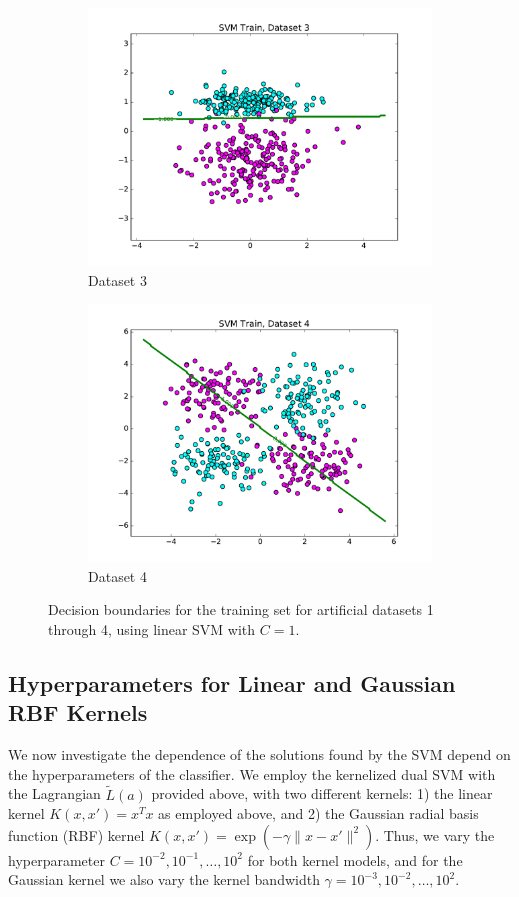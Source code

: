 \documentclass[10pt,psamsfonts]{amsart}
\theoremstyle{definition}
\theoremstyle{remark}
\numberwithin{equation}{section}
\begin{document}
\begin{figure}
\begin{subfigure}[b]{0.23\textwidth}
		\includegraphics[width=\textwidth]{hw2_2-2_3_train.pdf}
		\caption{Dataset 3}
	\end{subfigure}
	\begin{subfigure}[b]{0.23\textwidth}
		\includegraphics[width=\textwidth]{hw2_2-2_4_train.pdf}
		\caption{Dataset 4}
	\end{subfigure}
	\caption{Decision boundaries for the training set for artificial datasets 1 through 4, using linear SVM with $C = 1$.}
\end{figure}

\subsection{Hyperparameters for Linear and Gaussian RBF Kernels} We now investigate the dependence of the solutions found by the SVM depend on the hyperparameters of the classifier. We employ the kernelized dual SVM with the Lagrangian $\tilde{L}(a)$ provided above, with two different kernels: 1) the linear kernel $K(x,x') = x^Tx$ as employed above, and 2) the Gaussian radial basis function (RBF) kernel $K(x,x') = \exp(-\gamma \|x-x'\|^2)$. Thus, we vary the hyperparameter $C = 10^{-2}, 10^{-1}, \dots, 10^2$ for both kernel models, and for the Gaussian kernel we also vary the kernel bandwidth $\gamma = 10^{-3}, 10^{-2}, \dots, 10^2$.
\end{document}
